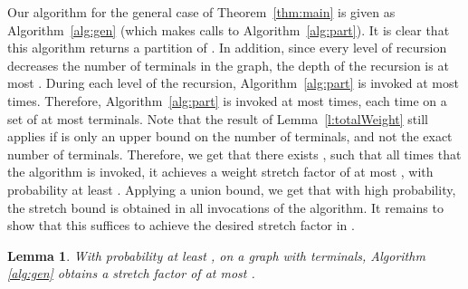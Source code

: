 \documentclass[twoside,leqno,twocolumn]{article}
\newtheorem{lemma}[theorem]{Lemma}
\begin{document}
Our algorithm for the general case of Theorem~\ref{thm:main} is given 
as Algorithm~\ref{alg:gen} (which makes calls to Algorithm~\ref{alg:part}).
It is clear that this algorithm returns a partition of . 
In addition, since every level of recursion decreases the number of terminals in the graph, the depth of the recursion is at most . During each level of the recursion, Algorithm~\ref{alg:part} is invoked at most  times. Therefore, Algorithm~\ref{alg:part} is invoked at most  times, each time on a set of at most  terminals. Note that the result of Lemma~\ref{l:totalWeight} still applies if  is only an upper bound on the number of terminals, and not the exact number of terminals. Therefore, we get that there exists , such that all  times that the algorithm is invoked, it achieves a weight stretch factor of at most , with probability at least . Applying a union bound, we get that with high probability, the stretch bound is obtained in all invocations of the algorithm. It remains to show that this suffices to achieve the desired stretch factor in . 
\begin{lemma} \label{l:discard}
With probability at least , on a graph with  terminals, 
Algorithm \ref{alg:gen} obtains a stretch factor of at most .
\end{lemma}
\end{document}
